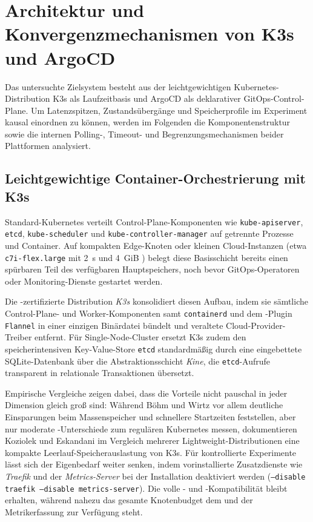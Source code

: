 \chapter{Architektur und Konvergenzmechanismen von K3s und ArgoCD}
\label{chap:architektur-k3s-argocd}

Das untersuchte Zielsystem besteht aus der leichtgewichtigen Kubernetes-Distribution K3s als Laufzeitbasis und ArgoCD als deklarativer GitOps-Control-Plane. Um Latenzspitzen, Zustandsübergänge und Speicherprofile im Experiment kausal einordnen zu können, werden im Folgenden die Komponentenstruktur sowie die internen Polling-, Timeout- und Begrenzungsmechanismen beider Plattformen analysiert.

\section{Leichtgewichtige Container-Orchestrierung mit K3s}
\label{sec:leichtgewichtige-orchestrierung-k3s}

Standard-Kubernetes verteilt Control-Plane-Komponenten wie \texttt{kube-apiserver}, \texttt{etcd}, \texttt{kube-scheduler} und \texttt{kube-controller-manager} auf getrennte Prozesse und Container.\autocite{burns_borg_2016} Auf kompakten Edge-Knoten oder kleinen Cloud-Instanzen (etwa  \texttt{c7i-flex.large} mit 2~s und 4~GiB ) belegt diese Basisschicht bereits einen spürbaren Teil des verfügbaren Hauptspeichers, noch bevor GitOps-Operatoren oder Monitoring-Dienste gestartet werden.\autocite{koziolek_k3s_2023}

Die -zertifizierte Distribution \textit{K3s} konsolidiert diesen Aufbau, indem sie sämtliche Control-Plane- und Worker-Komponenten samt \texttt{containerd} und dem -Plugin \texttt{Flannel} in einer einzigen Binärdatei bündelt und veraltete Cloud-Provider-Treiber entfernt.\autocite{k3s_architecture_2026} Für Single-Node-Cluster ersetzt K3s zudem den speicherintensiven Key-Value-Store \texttt{etcd} standardmäßig durch eine eingebettete SQLite-Datenbank über die Abstraktionsschicht \textit{Kine}, die \texttt{etcd}-Aufrufe transparent in relationale Transaktionen übersetzt.\autocite{k3s_architecture_2026}

Empirische Vergleiche zeigen dabei, dass die Vorteile nicht pauschal in jeder Dimension gleich groß sind: Während Böhm und Wirtz vor allem deutliche Einsparungen beim Massenspeicher und schnellere Startzeiten feststellen, aber nur moderate -Unterschiede zum regulären Kubernetes messen,\autocite{boehm_k3s_2021} dokumentieren Koziolek und Eskandani im Vergleich mehrerer Lightweight-Distributionen eine kompakte Leerlauf-Speicherauslastung von K3s.\autocite{koziolek_k3s_2023} Für kontrollierte Experimente lässt sich der Eigenbedarf weiter senken, indem vorinstallierte Zusatzdienste wie \textit{Traefik} und der \textit{Metrics-Server} bei der Installation deaktiviert werden (\texttt{--disable traefik --disable metrics-server}). Die volle - und -Kompatibilität bleibt erhalten, während nahezu das gesamte Knotenbudget dem  und der Metrikerfassung zur Verfügung steht.

